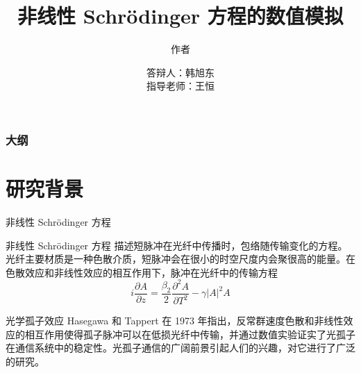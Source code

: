 \documentclass[aspectratio=169]{beamer}
\title[非线性 Schr\"odinger 方程的数值模拟]{非线性 Schr\"odinger 方程的数值模拟}
\subtitle[作者]{作者}
\author{答辩人：韩旭东\\指导老师：王恒}
\institute{专业：应用物理学}
\date{\zhtoday}
\begin{document}
\begin{frame}
\titlepage
\end{frame}

\begin{frame}
  \frametitle{大纲}

  \centering

  \begin{minipage}{.75\textwidth}
 
  
        \tableofcontents

  \end{minipage}  
\end{frame}

\section{研究背景}
\begin{frame}{非线性 Schr\"odinger 方程}
  \begin{block}{非线性 Schr\"odinger 方程}
    描述短脉冲在光纤中传播时，包络随传输变化的方程。光纤主要材质是一种色散介质，短脉冲会在很小的时空尺度内会聚很高的能量。在色散效应和非线性效应的相互作用下，脉冲在光纤中的传输方程
    $$
      i\frac{\partial A}{\partial z}=\frac{\beta_2}{2}\frac{\partial^2A}{\partial T^2}-\gamma|A|^2A
    $$
  \end{block}
  \begin{block}{光学孤子效应}
    Hasegawa 和 Tappert 在 1973 年指出，反常群速度色散和非线性效应的相互作用使得孤子脉冲可以在低损光纤中传输，并通过数值实验证实了光孤子在通信系统中的稳定性。光孤子通信的广阔前景引起人们的兴趣，对它进行了广泛的研究。
  \end{block}  
\end{frame}
\end{document}
